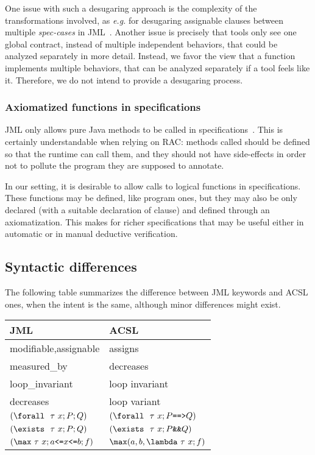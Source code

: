 One issue with such a desugaring approach is the complexity of the
transformations involved, as \emph{e.g.} for desugaring assignable clauses
between multiple \textit{spec-cases} in
JML~\cite{raghavan00desugaring}.  Another issue is precisely that
tools only see one global contract, instead of multiple independent
behaviors, that could be analyzed separately in more detail.
Instead, we favor the view that a function implements multiple
behaviors, that can be analyzed separately if a tool feels like
it. Therefore, we do not intend to provide a desugaring process.

\subsubsection*{Axiomatized functions in specifications}

JML only allows pure Java methods to be called in
specifications~\cite{leavens00preliminary}. This is certainly
understandable when relying on RAC: methods called should be defined
so that the runtime can call them, and they should not have
side-effects in order not to pollute the program they are supposed to
annotate.

In our setting, it is desirable to allow calls to logical functions in
specifications. These functions may be defined, like program ones, but
they may also be only declared (with a suitable declaration of \reads
clause) and defined through an axiomatization.
This makes for richer specifications that may be useful either in
automatic or in manual deductive verification.

\subsection{Syntactic differences}

The following table summarizes the difference between JML keywords and
ACSL ones, when the intent is the same, although minor differences
might exist.

\begin{center}
\begin{tabular}{|l|l|}
\hline
  JML                  & ACSL \\ \hline
  modifiable,assignable           & assigns \\
  measured\_by         & decreases \\
  loop\_invariant      & loop invariant \\
  decreases            & loop variant \\
  $(\texttt{{\textbackslash}forall}~~\tau~x ; P ; Q)$ &   $(\Forall~\tau~x ; P \verb|==>| Q)$ \\
  $(\texttt{{\textbackslash}exists}~~\tau~x ; P ; Q)$ &   $(\Exists~\tau~x ; P \verb|&&| Q)$ \\
  $(\verb|\max|~\tau~x ; a \verb|<=| x \verb|<=| b ; f)$ &
  $\verb|\max|(a,b,\verb|\lambda|~\tau~x ; f)$ \\
  \hline
\end{tabular}
\end{center}




